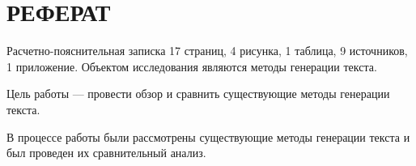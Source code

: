 \chapter*{РЕФЕРАТ}

Расчетно-пояснительная записка 17 страниц, 4 рисунка, 1 таблица, 9 источников, 1 приложение.
Объектом исследования являются методы генерации текста.

Цель работы --- провести обзор и сравнить существующие методы генерации текста. 

В процессе работы были рассмотрены существующие методы генерации текста и был проведен их сравнительный анализ.
